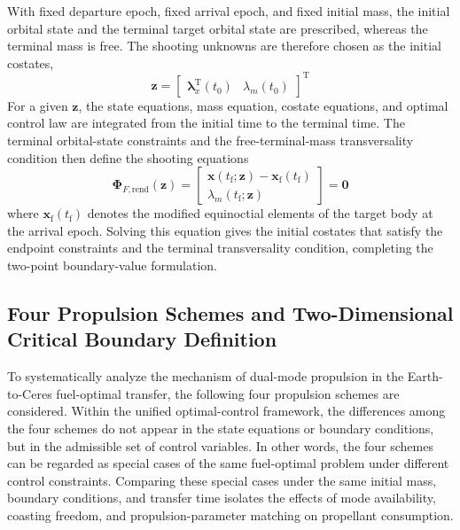 \documentclass{IEEEtaes}
\begin{document}
With fixed departure epoch, fixed arrival epoch, and fixed initial mass, the initial orbital state and the terminal target orbital state are prescribed, whereas the terminal mass is free. The shooting unknowns are therefore chosen as the initial costates,
\begin{equation}
\bm{z}=\begin{bmatrix}\bm{\lambda}_x^{\mathrm{T}}(t_0)&\lambda_m(t_0)\end{bmatrix}^{\mathrm{T}}
\end{equation}
For a given $\bm{z}$, the state equations, mass equation, costate equations, and optimal control law are integrated from the initial time to the terminal time. The terminal orbital-state constraints and the free-terminal-mass transversality condition then define the shooting equations
\begin{equation}
\bm{\Phi}_{F,\mathrm{rend}}(\bm{z})=
\begin{bmatrix}
\bm{x}(t_{\mathrm{f}};\bm{z})-\bm{x}_{\mathrm{f}}(t_{\mathrm{f}})\\
\lambda_m(t_{\mathrm{f}};\bm{z})
\end{bmatrix}=\bm{0}
\end{equation}
where $\bm{x}_{\mathrm{f}}(t_{\mathrm{f}})$ denotes the modified equinoctial elements of the target body at the arrival epoch. Solving this equation gives the initial costates that satisfy the endpoint constraints and the terminal transversality condition, completing the two-point boundary-value formulation.

\subsection{Four Propulsion Schemes and Two-Dimensional Critical Boundary Definition}
To systematically analyze the mechanism of dual-mode propulsion in the Earth-to-Ceres fuel-optimal transfer, the following four propulsion schemes are considered. Within the unified optimal-control framework, the differences among the four schemes do not appear in the state equations or boundary conditions, but in the admissible set of control variables. In other words, the four schemes can be regarded as special cases of the same fuel-optimal problem under different control constraints. Comparing these special cases under the same initial mass, boundary conditions, and transfer time isolates the effects of mode availability, coasting freedom, and propulsion-parameter matching on propellant consumption.
\end{document}
